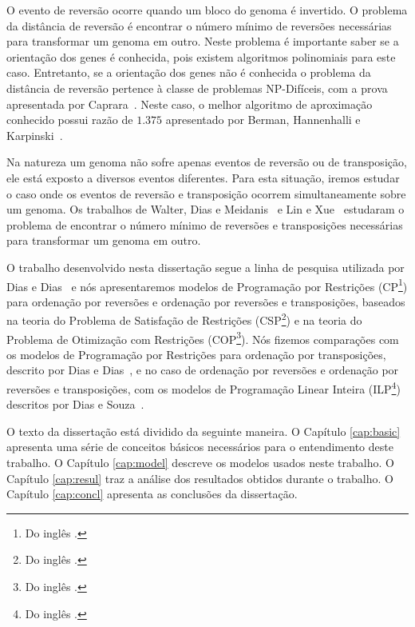 O evento de reversão ocorre quando um bloco do genoma é invertido. O
problema da distância de reversão é encontrar o número mínimo de
reversões necessárias para transformar um genoma em outro. Neste
problema é importante saber se a orientação dos genes é conhecida,
pois existem algoritmos polinomiais para este caso. Entretanto, se a
orientação dos genes não é conhecida o problema da distância de
reversão pertence à classe de problemas NP-Difíceis, com a prova
apresentada por Caprara~\cite{Caprara*1997}. Neste caso, o melhor
algoritmo de aproximação conhecido possui razão de $1.375$ apresentado
por Berman, Hannenhalli e
Karpinski~\cite{BermanHannenhalliKarpinski*2002}.

Na natureza um genoma não sofre apenas eventos de reversão ou de
transposição, ele está exposto a diversos eventos diferentes. Para
esta situação, iremos estudar o caso onde os eventos de reversão e
transposição ocorrem simultaneamente sobre um genoma. Os trabalhos de
Walter, Dias e
Meidanis~\cite{MeidanisWalterDias*2002,WalterDiasMeidanis*1998} e Lin
e Xue~\cite{LinXue*1999} estudaram o problema de encontrar o número
mínimo de reversões e transposições necessárias para transformar um
genoma em outro.

O trabalho desenvolvido nesta dissertação segue a linha de pesquisa
utilizada por Dias e Dias~\cite{DiasDias*2009} e nós apresentaremos
modelos de Programação por Restrições (CP\footnote{Do
inglês .}) para ordenação por reversões e
ordenação por reversões e transposições, baseados na teoria do
Problema de Satisfação de Restrições (CSP\footnote{Do
inglês .}) e na teoria do
Problema de Otimização com Restrições (COP\footnote{Do
inglês .}). Nós fizemos
comparações com os modelos de Programação por Restrições para
ordenação por transposições, descrito por Dias e
Dias~\cite{DiasDias*2009}, e no caso de ordenação por reversões e
ordenação por reversões e transposições, com os modelos de Programação
Linear Inteira (ILP\footnote{Do inglês .}) descritos por Dias e Souza~\cite{DiasSouza*2007}.

O texto da dissertação está dividido da seguinte maneira. O
Capítulo \ref{cap:basic} apresenta uma série de conceitos básicos
necessários para o entendimento deste trabalho. O
Capítulo \ref{cap:model} descreve os modelos usados neste trabalho. O
Capítulo \ref{cap:resul} traz a análise dos resultados obtidos durante
o trabalho. O Capítulo \ref{cap:concl} apresenta as conclusões da
dissertação.
